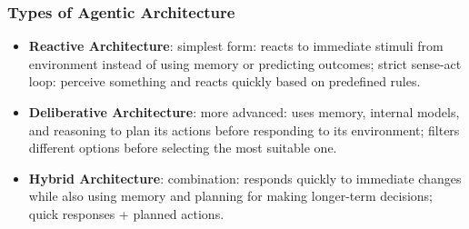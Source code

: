 \documentclass[12pt, letterpaper]{article}
\begin{document}
\subsubsection{Types of Agentic Architecture}
\begin{itemize}
    \item \textbf{Reactive Architecture}: simplest form: reacts to immediate stimuli from environment instead of using memory or predicting outcomes; strict sense-act loop: perceive something and reacts quickly based on predefined rules.
    \item \textbf{Deliberative Architecture}: more advanced: uses memory, internal models, and reasoning to plan its actions before responding to its environment; filters different options before selecting the most suitable one.
    \item \textbf{Hybrid Architecture}: combination: responds quickly to immediate changes while also using memory and planning for making longer-term decisions; quick responses + planned actions.
\end{itemize}
\end{document}
